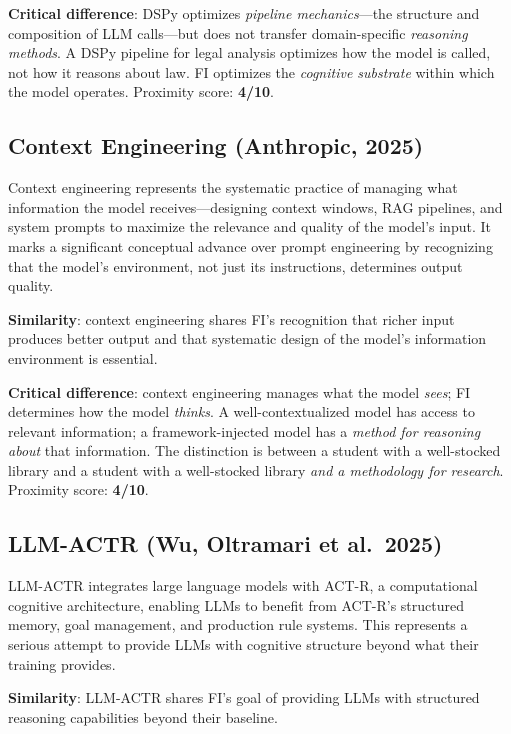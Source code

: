 \documentclass[12pt,a4paper]{article}
\begin{document}
\textbf{Critical difference}: DSPy optimizes \emph{pipeline mechanics}---the structure and composition of LLM calls---but does not transfer domain-specific \emph{reasoning methods}. A DSPy pipeline for legal analysis optimizes how the model is called, not how it reasons about law. FI optimizes the \emph{cognitive substrate} within which the model operates. Proximity score: \textbf{4/10}.

\subsection{Context Engineering (Anthropic, 2025)}

Context engineering \cite{anthropic2025context} represents the systematic practice of managing what information the model receives---designing context windows, RAG pipelines, and system prompts to maximize the relevance and quality of the model's input. It marks a significant conceptual advance over prompt engineering by recognizing that the model's environment, not just its instructions, determines output quality.

\textbf{Similarity}: context engineering shares FI's recognition that richer input produces better output and that systematic design of the model's information environment is essential.

\textbf{Critical difference}: context engineering manages what the model \emph{sees}; FI determines how the model \emph{thinks}. A well-contextualized model has access to relevant information; a framework-injected model has a \emph{method for reasoning about} that information. The distinction is between a student with a well-stocked library and a student with a well-stocked library \emph{and a methodology for research}. Proximity score: \textbf{4/10}.

\subsection{LLM-ACTR (Wu, Oltramari et al.~2025)}

LLM-ACTR \cite{wu2025cognitive} integrates large language models with ACT-R, a computational cognitive architecture, enabling LLMs to benefit from ACT-R's structured memory, goal management, and production rule systems. This represents a serious attempt to provide LLMs with cognitive structure beyond what their training provides.

\textbf{Similarity}: LLM-ACTR shares FI's goal of providing LLMs with structured reasoning capabilities beyond their baseline.
\end{document}
